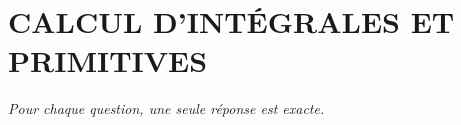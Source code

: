 
\section*{\textcolor{chapcolor}{\MakeUppercase{Calcul d'intégrales et primitives}}}

\begin{center}
\textit{Pour chaque question, une seule réponse est exacte.}
\end{center}

